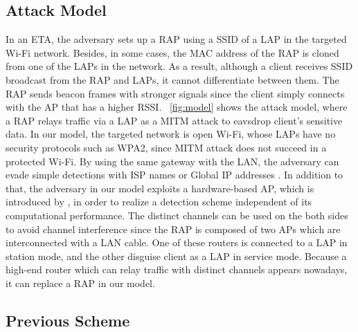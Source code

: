 \documentclass[conference]{IEEEtran}
\begin{document}
\subsection{Attack Model}
In an ETA, the adversary sets up a RAP using a SSID of a LAP in the targeted Wi-Fi network.
Besides, in some cases, the MAC address of the RAP is cloned from one of the LAPs in the network\cite{spoof-evi}.
As a result, although a client receives SSID broadcast from the RAP and LAPs, it cannot differentiate between them.
The RAP sends beacon frames with stronger signals since the client simply connects with the AP that has a higher RSSI.
\figurename~\ref{fig:model} shows the attack model, where a RAP relays traffic via a LAP as a MITM attack to eavsdrop client's sensitive data.
In our model, the targeted network is open Wi-Fi, whose LAPs have no security protocols such as WPA2, since MITM attack does not succeed in a protected Wi-Fi\cite{kataoka}.
By using the same gateway with the LAN, the adversary can evade simple detections with ISP names or Global IP addresses \cite{rtt}.
In addition to that, the adversary in our model exploits a hardware-based AP, which is introduced by \cite{previous}, in order to realize a detection scheme independent of its computational performance.
The distinct channels can be used on the both sides to avoid channel interference since the RAP is composed of two APs which are interconnected with a LAN cable.
One of these routers is connected to a LAP in station mode, and the other disguise client as a LAP in service mode.
Because a high-end router which can relay traffic with distinct channels appears nowadays, it can replace a RAP in our model.

\subsection{Previous Scheme}
\end{document}
